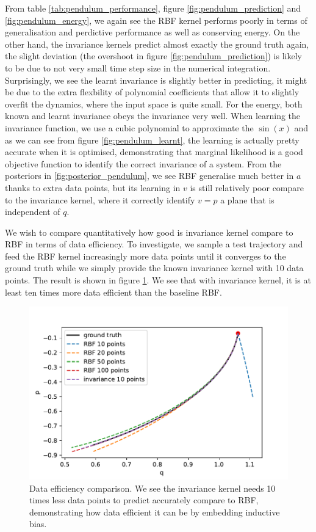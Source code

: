 \documentclass{statsmsc}
\begin{document}
From table \ref{tab:pendulum_performance}, figure \ref{fig:pendulum_prediction} and \ref{fig:pendulum_energy}, we again see the RBF kernel performs poorly in terms of generalisation and perdictive performance as well as conserving energy.
On the other hand, the invariance kernels predict almost exactly the ground truth again, the slight deviation (the overshoot in figure \ref{fig:pendulum_prediction}) is likely to be due to not very small time step size in the numerical integration. 
Surprisingly, we see the learnt invariance is slightly better in predicting, it might be due to the extra flexbility of polynomial coefficients that allow it to slightly overfit the dynamics, where the input space is quite small.
For the energy, both known and learnt invariance obeys the invariance very well.
When learning the invariance function, we use a cubic polynomial to approximate the $\sin(x)$ and as we can see from figure \ref{fig:pendulum_learnt}, the learning is actually pretty accurate when it is optimised, demonstrating that marginal likelihood is a good objective function to identify the correct invariance of a system.
From the posteriors in \ref{fig:posterior_pendulum}, we see RBF generalise much better in $a$ thanks to extra data points, but its learning in $v$ is still relatively poor compare to the invariance kernel, where it correctly identify $v=p$ a plane that is independent of $q$.

We wish to compare quantitatively how good is invariance kernel compare to RBF in terms of data efficiency. 
To investigate, we sample a test trajectory and feed the RBF kernel increasingly more data points until it converges to the ground truth while we simply provide the known invariance kernel with 10 data points.
The result is shown in figure \ref{fig:data_efficiency}. 
We see that with invariance kernel, it is at least ten times more data efficient than the baseline RBF.

\begin{figure}[H] 
  \includegraphics[width=0.8\linewidth]{../codes/figures/data_efficiency.pdf}
  \centering
  \caption{Data efficiency comparison. We see the invariance kernel needs 10 times less data points to predict accurately compare to RBF, demonstrating how data efficient it can be by embedding inductive bias.}
  \label{fig:data_efficiency}
\end{figure}
\end{document}
